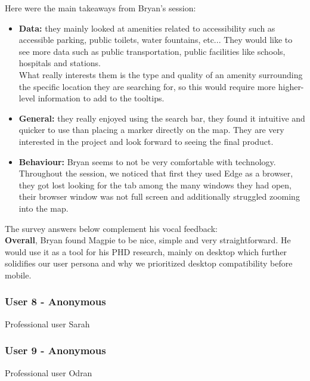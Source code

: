 \newpage Here were the main takeaways from Bryan's session:
\begin{itemize}
    \item \textbf{Data: }they mainly looked at amenities related to accessibility such as accessible parking, public toilets, water fountains, etc... They would like to see more data such as public transportation, public facilities like schools, hospitals and stations.\\ What really interests them is the type and quality of an amenity surrounding the specific location they are searching for, so this would require more higher-level information to add to the tooltips.\\
    \item \textbf{General: }they really enjoyed using the search bar, they found it intuitive and quicker to use than placing a marker directly on the map. They are very interested in the project and look forward to seeing the final product.\\
    \item \textbf{Behaviour: } Bryan seems to not be very comfortable with technology. Throughout the session, we noticed that first they used Edge as a browser, they got lost looking for the tab among the many windows they had open, their browser window was not full screen and additionally struggled zooming into the map.
\end{itemize}
The survey answers below complement his vocal feedback:
\\

\textbf{Overall}, Bryan found Magpie to be nice, simple and very straightforward. He would use it as a tool for his PHD research, mainly on desktop which further solidifies our user persona and why we prioritized desktop compatibility before mobile.

\newpage
\subsubsection{User 8 - Anonymous}
Professional user Sarah

\newpage
\subsubsection{User 9 - Anonymous}
Professional user Odran